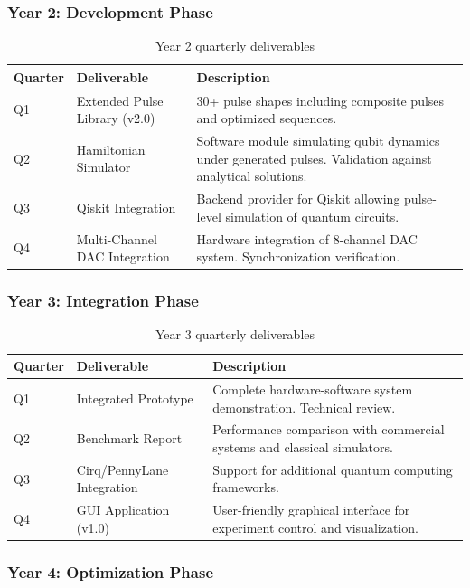 \documentclass[12pt,a4paper]{article}
\theoremstyle{definition}
\begin{document}
\subsubsection{Year 2: Development Phase}

\begin{longtable}{@{}p{1.5cm}p{4cm}p{7cm}@{}}
\caption{Year 2 quarterly deliverables} \label{tab:year2} \\
\toprule
\textbf{Quarter} & \textbf{Deliverable} & \textbf{Description} \\
\midrule
\endfirsthead
Q1 & Extended Pulse Library (v2.0) & 30+ pulse shapes including composite pulses and optimized sequences. \\
\midrule
Q2 & Hamiltonian Simulator & Software module simulating qubit dynamics under generated pulses. Validation against analytical solutions. \\
\midrule
Q3 & Qiskit Integration & Backend provider for Qiskit allowing pulse-level simulation of quantum circuits. \\
\midrule
Q4 & Multi-Channel DAC Integration & Hardware integration of 8-channel DAC system. Synchronization verification. \\
\bottomrule
\end{longtable}

\subsubsection{Year 3: Integration Phase}

\begin{longtable}{@{}p{1.5cm}p{4cm}p{7cm}@{}}
\caption{Year 3 quarterly deliverables} \label{tab:year3} \\
\toprule
\textbf{Quarter} & \textbf{Deliverable} & \textbf{Description} \\
\midrule
\endfirsthead
Q1 & Integrated Prototype & Complete hardware-software system demonstration. Technical review. \\
\midrule
Q2 & Benchmark Report & Performance comparison with commercial systems and classical simulators. \\
\midrule
Q3 & Cirq/PennyLane Integration & Support for additional quantum computing frameworks. \\
\midrule
Q4 & GUI Application (v1.0) & User-friendly graphical interface for experiment control and visualization. \\
\bottomrule
\end{longtable}

\subsubsection{Year 4: Optimization Phase}
\end{document}
